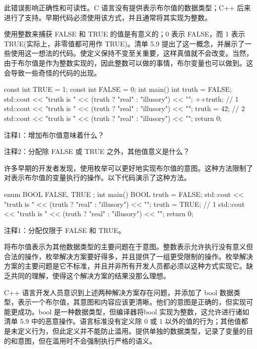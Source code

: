 此错误影响正确性和可读性。C 语言没有提供表示布尔值的数据类型；C++ 后来进行了支持。早期代码必须使用该方式，并且通常将其实现为整数。


使用整数来捕获 FALSE 和 TRUE 的值是有意义的；0 表示 FALSE，而 1 表示 TRUE(实际上，非零值都可用作 TRUE)。清单 5.9 提出了这一概念，并展示了一些使用这一想法的代码。使定义保持不变至关重要，这样真值就不会改变。当然，由于布尔值是作为整数实现的，因此整数可以做的事情，布尔变量也可以做到。这会导致一些奇怪的代码的出现。


\begin{cpp}
const int TRUE = 1;
const int FALSE = 0;
int main() {
  int truth = FALSE;
  std::cout << "truth is " << (truth ? "real" : "illusory") << "\n";
  ++truth; // 1
  std::cout << "truth is " << (truth ? "real" : "illusory") << "\n";
  truth = 42; // 2
  std::cout << "truth is " << (truth ? "real" : "illusory") << "\n";
  return 0;
}
\end{cpp}

{\footnotesize
注释1：增加布尔值意味着什么？

注释2：分配除 FALSE 或 TRUE 之外，其他值意义是什么？
}

许多早期的开发者发现，使用枚举可以更好地实现布尔值的意图。这种方法限制了对表示布尔值的变量执行的操作。以下代码演示了这种方法。


\begin{cpp}
enum BOOL { FALSE, TRUE };
int main() {
  BOOL truth = FALSE;
  std::cout << "truth is " << (truth ? "real" : "illusory") << "\n";
  truth = TRUE; // 1
  std::cout << "truth is " << (truth ? "real" : "illusory") << "\n";
  return 0;
}
\end{cpp}

{\footnotesize
注释1：分配仅限于 FALSE 和 TRUE。
}


将布尔值表示为其他数据类型的主要问题在于意图。整数表示允许执行没有意义但合法的操作，枚举解决方案要好得多，并且提供了一组更受限制的操作。枚举解决方案的主要问题是它不标准，并且并非所有开发人员都必须以这种方式实现它。缺乏共同的理解，使得这个解决方案的结果没那么理想。


C++ 语言开发人员意识到上述两种解决方案存在问题，并添加了 bool 数据类型，表示一个布尔值，其意图和内容应该更清晰。他们的意图是正确的，但实现可能更成功。bool 是一种数据类型，但编译器将bool 实现为整数，这允许进行诸如清单 5.9 中的恶意操作。语言标准没有定义除 0 或 1 以外的值的行为；其他值都是未定义行为，但此定义并不能防止滥用。提供单独的数据类型，记录了变量的目的和意图，但在滥用时不会强制执行严格的语义。

